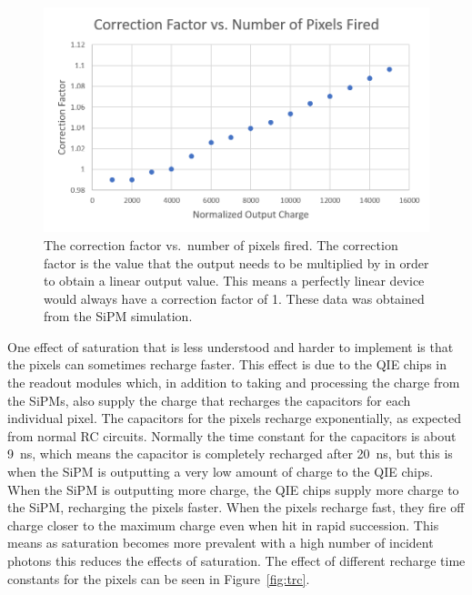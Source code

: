 \begin{figure}
\centering
\includegraphics[width=\linewidth]{Figures/CorFac.png}
\caption{The correction factor vs.\ number of pixels fired. The correction factor is the value that the output needs to be multiplied by in order to obtain a linear output value. This means a perfectly linear device would always have a correction factor of 1. These data was obtained from the SiPM simulation.}
\label{fig:Cor}
\end{figure}

One effect of saturation that is less understood and harder to implement is that the pixels can sometimes recharge faster. This effect is due to the QIE chips in the readout modules which, in addition to taking and processing the charge from the SiPMs, also supply the charge that recharges the capacitors for each individual pixel. The capacitors for the pixels recharge exponentially, as expected from normal RC circuits. Normally the time constant for the capacitors is about 9~ns, which means the capacitor is completely recharged after 20~ns, but this is when the SiPM is outputting a very low amount of charge to the QIE chips. When the SiPM is outputting more charge, the QIE chips supply more charge to the SiPM, recharging the pixels faster. When the pixels recharge fast, they fire off charge closer to the maximum charge even when hit in rapid succession. This means as saturation becomes more prevalent with a high number of incident photons this reduces the effects of saturation. The effect of different recharge time constants for the pixels can be seen in Figure~\ref{fig:trc}.

